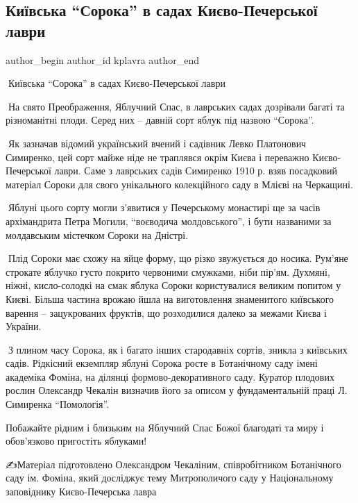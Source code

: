  
 
 
 
 

\subsection{Київська \enquote{Сорока} в садах Києво-Печерської лаври}
\label{sec:19_08_2023.fb.kplavra.1.kyivska_soroka_v_sadah_kyiv_pechersk_lavra}

\ifcmt
 author_begin
   author_id kplavra
 author_end
\fi

🍏Київська \enquote{Сорока} в садах Києво-Печерської лаври 

🍎На свято Преображення, Яблучний Спас, в лаврських садах дозрівали багаті та
різноманітні плоди. Серед них – давній сорт яблук під назвою \enquote{Сорока}.

🍏Як зазначав відомий український вчений і садівник Левко Платонович Симиренко,
цей сорт майже ніде не траплявся окрім Києва і переважно Києво-Печерської
лаври. Саме з лаврських садів Симиренко 1910 р. взяв посадковий матеріал Сороки
для свого унікального колекційного саду в Млієві на Черкащині. 

🍎Яблуні цього сорту могли з'явитися у Печерському монастирі ще за часів
архімандрита Петра Могили, \enquote{воєводича молдовського}, і бути названими
за молдавським містечком Сороки на Дністрі.  

🍏Плід Сороки має схожу на яйце форму, що різко звужується до носика. Рум'яне
строкате яблучко густо покрито червоними смужками, ніби пір'ям. Духмяні, ніжні,
кисло-солодкі на смак яблука Сороки користувалися великим попитом у Києві.
Більша частина врожаю йшла на виготовлення знаменитого київського варення –
зацукрованих фруктів, що розходилися далеко за межами Києва і України.  

🍎З плином часу Сорока, як і багато інших стародавніх сортів, зникла з
київських садів. Рідкісний екземпляр яблуні Сорока росте в Ботанічному саду
імені академіка Фоміна, на ділянці формово-декоративного саду. Куратор плодових
рослин Олександр Чекалін визначив його за описом у фундаментальній праці Л.
Симиренка \enquote{Помологія}.

Побажайте рідним і близьким на Яблучний Спас Божої благодаті та миру і
обов'язково пригостіть яблуками!

✍️Матеріал підготовлено Олександром Чекаліним, співробітником Ботанічного саду
ім. Фоміна, який досліджує тему Митрополичого саду у Національному заповіднику
Києво-Печерська лавра
